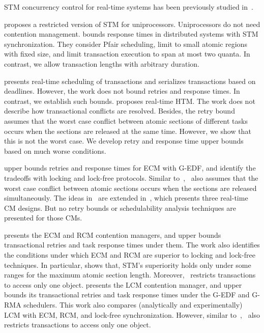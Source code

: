 \documentclass[prodmode,acmtecs]{acmsmall}
\begin{document}
STM concurrency control for real-time systems has been previously studied in~\cite{manson2006preemptible,fahmy2009bounding,sarni2009real,schoeberl2010rttm,key-1,barrosmanaging,stmconcurrencycontrol:emsoft11,lcmdac2012,shambake_phd_proposal}.


\cite{manson2006preemptible} proposes a restricted version of STM for uniprocessors. Uniprocessors do not need contention management. \cite{fahmy2009bounding} bounds response times in distributed  systems with STM synchronization. They consider Pfair scheduling, limit to small atomic regions with fixed size, and limit transaction execution to span at most two quanta. In contrast, we allow transaction lengths with  arbitrary duration. 

\cite{sarni2009real} presents real-time scheduling of transactions and serializes transactions based on deadlines. However, the work does not bound retries and response times. In contrast, we establish such bounds. \cite{schoeberl2010rttm} proposes real-time HTM. The work does not describe how transactional conflicts are resolved. Besides, the retry bound assumes that the worst case conflict between atomic sections of different tasks occurs when the sections are released at the same time. However, we show that this is not the worst case. We develop retry and response time upper bounds based on much worse conditions.


\cite{key-1} upper bounds retries and response times for  ECM with G-EDF, and identify the tradeoffs with locking and lock-free protocols. Similar to~\cite{schoeberl2010rttm},~\cite{key-1} also assumes that the worst case conflict between atomic sections occurs when the sections are released simultaneously. The ideas in~\cite{key-1} are extended in~\cite{barrosmanaging}, which presents three real-time CM designs. But no retry bounds or schedulability analysis techniques are presented for those CMs. 

\cite{stmconcurrencycontrol:emsoft11} presents the ECM and RCM contention managers, and upper bounds transactional retries and task response times under them. The work also identifies the conditions under which ECM and RCM are superior to locking and lock-free techniques. In particular, \cite{stmconcurrencycontrol:emsoft11} shows that, STM's superiority holds only under some ranges for the maximum atomic section length.  Moreover,~\cite{stmconcurrencycontrol:emsoft11} restricts transactions to access only one object.
%
\cite{lcmdac2012} presents the LCM contention manager, and upper bounds its transactional retries and task response times under the G-EDF and G-RMA schedulers. This work also compares (analytically and experimentally) LCM with ECM, RCM, and lock-free synchronization. However, similar to~\cite{stmconcurrencycontrol:emsoft11},~\cite{lcmdac2012} also restricts transactions to access only one object.
\end{document}
